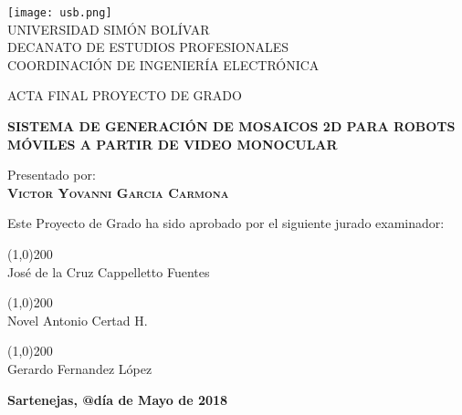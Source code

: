 \begin{titlepage}
\begin{center}

\texttt{[image: usb.png]} \\

\textsc {\large UNIVERSIDAD SIMÓN BOLÍVAR} \\
\textsc{DECANATO DE ESTUDIOS PROFESIONALES\\
COORDINACIÓN DE INGENIERÍA ELECTRÓNICA}

\bigskip
\bigskip
\bigskip
\bigskip

\textsc{ACTA FINAL PROYECTO DE GRADO}

\bigskip
\bigskip

\textsc{\bfseries SISTEMA DE GENERACIÓN DE MOSAICOS 2D PARA ROBOTS MÓVILES A PARTIR DE VIDEO MONOCULAR}

\bigskip
\bigskip
\bigskip

\begin{minipage}{\textwidth}
\centering
Presentado por: \\
\textsc{\bfseries Victor Yovanni Garcia Carmona} \\

\bigskip
\bigskip

Este Proyecto de Grado ha sido aprobado por el siguiente jurado examinador: \\

\bigskip
\bigskip

\line(1,0){200} \\
José de la Cruz Cappelletto Fuentes\\

\bigskip
\bigskip

\line(1,0){200} \\
Novel Antonio Certad H.\\


\bigskip
\bigskip

\line(1,0){200} \\
Gerardo Fernandez López\\

\bigskip
\bigskip

\end{minipage}

\bigskip
\bigskip
\vfill

{\large \bfseries Sartenejas, @día de Mayo de 2018}

\end{center}
\end{titlepage}
